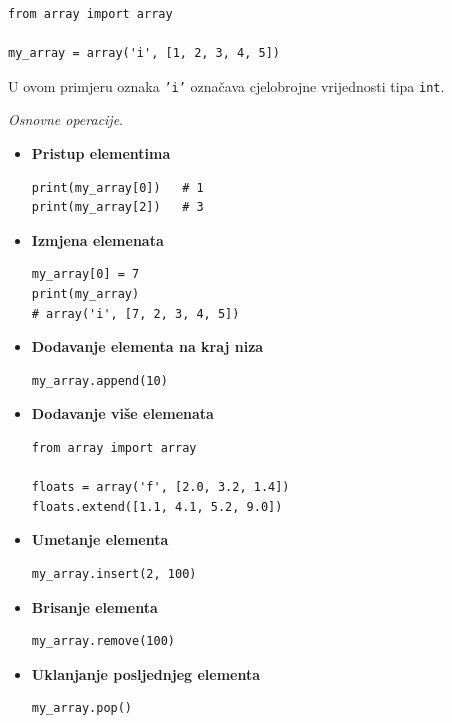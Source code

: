 \begin{verbatim}
from array import array

my_array = array('i', [1, 2, 3, 4, 5])
\end{verbatim}

U ovom primjeru oznaka \texttt{'i'} označava cjelobrojne vrijednosti tipa \texttt{int}.

\textit{Osnovne operacije}. 

\begin{itemize}
	
	\item \textbf{Pristup elementima}
	
	\begin{verbatim}
print(my_array[0])   # 1
print(my_array[2])   # 3
\end{verbatim}
	
	\item \textbf{Izmjena elemenata}
	
	\begin{verbatim}
my_array[0] = 7
print(my_array)
# array('i', [7, 2, 3, 4, 5])
\end{verbatim}
	
	\item \textbf{Dodavanje elementa na kraj niza}
	
	\begin{verbatim}
my_array.append(10)
\end{verbatim}
	
	\item \textbf{Dodavanje više elemenata}
	
	\begin{verbatim}
from array import array

floats = array('f', [2.0, 3.2, 1.4])
floats.extend([1.1, 4.1, 5.2, 9.0])
\end{verbatim}
	
	\item \textbf{Umetanje elementa}
	
	\begin{verbatim}
my_array.insert(2, 100)
\end{verbatim}
	
	\item \textbf{Brisanje elementa}
	
	\begin{verbatim}
my_array.remove(100)
\end{verbatim}
	
	\item \textbf{Uklanjanje posljednjeg elementa}
	
	\begin{verbatim}
my_array.pop()
\end{verbatim}
	
\end{itemize}

